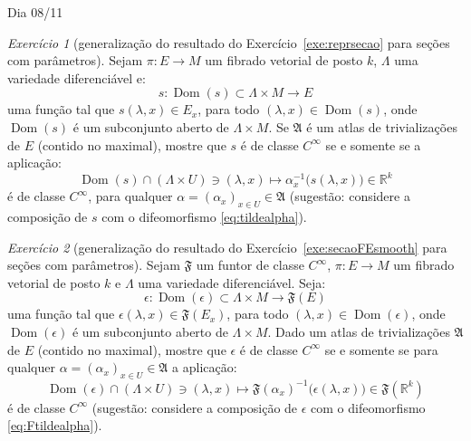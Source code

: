 \documentclass[oneside,11pt]{amsart}
\newcommand{\R}{\mathds R}
\DeclareMathOperator{\Dom}{Dom}
\theoremstyle{remark}\newtheorem{exercise}{Exercício}[section]
\theoremstyle{plain}\newtheorem{teo}{Teorema}[section]
\theoremstyle{plain}\newtheorem{lem}[teo]{Lema}
\theoremstyle{plain}\newtheorem{prop}[teo]{Proposição}
\theoremstyle{definition}\newtheorem{defin}[teo]{Definição}
\theoremstyle{remark}\newtheorem{rem}[teo]{Observação}
\theoremstyle{definition}\newtheorem{example}[teo]{Exemplo}
\numberwithin{equation}{section}
\begin{document}
\begin{section}{Dia 08/11}

\begin{exercise}[generalização do resultado do Exercício~\ref{exe:reprsecao} para seções com parâmetros]\label{exe:smoothsecpar}
Sejam $\pi:E\to M$ um fibrado vetorial de posto $k$, $\Lambda$ uma variedade diferenciável e:
\[s:\Dom(s)\subset\Lambda\times M\longrightarrow E\]
uma função tal que $s(\lambda,x)\in E_x$, para todo $(\lambda,x)\in\Dom(s)$, onde $\Dom(s)$ é um subconjunto aberto de $\Lambda\times M$.
Se $\mathfrak A$ é um atlas de trivializações de $E$ (contido no maximal), mostre que $s$ é de classe $C^\infty$ se e somente se a aplicação:
\[\Dom(s)\cap(\Lambda\times U)\ni(\lambda,x)\longmapsto\alpha_x^{-1}\big(s(\lambda,x)\big)\in\R^k\]
é de classe $C^\infty$, para qualquer $\alpha=(\alpha_x)_{x\in U}\in\mathfrak A$ (sugestão:
considere a composição de $s$ com o difeomorfismo \eqref{eq:tildealpha}).
\end{exercise}

\begin{exercise}[generalização do resultado do Exercício~\ref{exe:secaoFEsmooth} para seções com parâmetros]\label{exe:secaoFEsmoothpar}
Sejam $\mathfrak F$ um funtor de classe $C^\infty$, $\pi:E\to M$ um fibrado vetorial de posto $k$ e $\Lambda$ uma variedade diferenciável.
Seja:
\[\epsilon:\Dom(\epsilon)\subset\Lambda\times M\longrightarrow\mathfrak F(E)\]
uma função tal que $\epsilon(\lambda,x)\in\mathfrak F(E_x)$, para todo $(\lambda,x)\in\Dom(\epsilon)$, onde $\Dom(\epsilon)$ é um subconjunto
aberto de $\Lambda\times M$.
Dado um atlas de trivializações $\mathfrak A$ de $E$ (contido no maximal), mostre que $\epsilon$ é de classe $C^\infty$ se e somente se
para qualquer $\alpha=(\alpha_x)_{x\in U}\in\mathfrak A$ a aplicação:
\begin{equation}\label{eq:Falphalambda}
\Dom(\epsilon)\cap(\Lambda\times U)\ni(\lambda,x)\longmapsto\mathfrak F(\alpha_x)^{-1}\big(\epsilon(\lambda,x)\big)\in\mathfrak F(\R^k)
\end{equation}
é de classe $C^\infty$ (sugestão: considere a composição de $\epsilon$ com o difeomorfismo \eqref{eq:Ftildealpha}).
\end{exercise}


\end{section}
\end{document}
